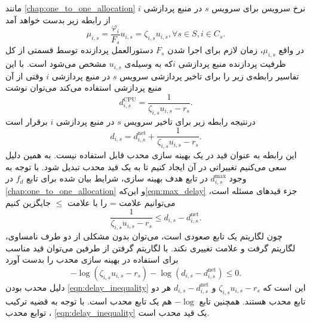     مانند \cref{chap:one_to_one_allocation} نرخ سرویس برای سرویس $s$ در منبع پردازشی $i$ از رابطه زیر بدست خواهد آمد
    \begin{equation}
      \mu_{i,s} = \frac{\varphi_i}{F_s} u_{i,s} = \zeta_{i,s} u_{i,s}, \forall s \in S, i \in C_s.
    \end{equation}
    در واقع $\mu_{i,s}$، زمان لازم برای اجرا شدن $F_s$ دستورالعمل پردازنده توسط قسمتی از کل ظرفیت پردازنده منبع پردازشی $i$که به وسیله‌ی $u_{i,s}$ مشخص می‌شود است.
    با این تفاسیر رابطه‌ی زیر را برای تاخیر پردازشی سرویس $s$ در منبع پردازشی $i$ وقتی از آن منبع پردازشی استفاده می‌کند می‌توان نوشت
    \begin{equation}
      d_{i,s}^\text{CPU} = \frac{1}{\zeta_{i,s} u_{i,s} - r_s}.
    \end{equation}
    درنتیجه رابطه زیر برای تاخیر سرویس $s$ در منبع پردازشی $i$ برقرار است
    \begin{equation}
      d_{i,s} = d_{i,s}^\text{net} + \frac{1}{\zeta_{i,s} u_{i,s} - r_s}.
    \end{equation}
    این رابطه به عنوان قید در یک بهینه سازی محدب قابل استفاده نیست.
    به همین دلیل سعی می‌کنیم تغییراتی در آن ایجاد کنیم تا به یک قید محدب تبدیل شود.
    با توجه به وجود $d_{i,s}^\text{max}$ در تابع هدف بهینه سازی، شرایط بیان شده برای تابع $f_d$ در \cref{chap:one_to_one_allocation} و این‌که\cref{eqn:max_delay} جزء قید‌های مسئله است، می‌توانیم علامت = را با علامت $\le$ جایگزین کنیم
    \begin{equation}
      \frac{1}{\zeta_{i,s} u_{i,s} - r_s} \le d_{i,s} - d_{i,s}^\text{net}.
    \end{equation}
    چون لگاریتم یک تابع صعودی است، می‌توان بدون مشکلی از دو طرف نامساوی، لگاریتم گرفت و علامت تغییری نکند.
    با لگاریتم گرفتن از طرفین می‌توان قید مناسب برای استفاده در بهینه سازی محدب را بدست آورد
    \begin{equation}\label{eqn:delay_inequality}
      - \log (\zeta_{i,s} u_{i,s} - r_s) - \log (d_{i,s} - d_{i,s}^\text{net}) \le 0.
    \end{equation}
    دلیل محدب بودن \cref{eqn:delay_inequality} این است که $\zeta_{i,s} u_{i,s} - r_s$ و $d_{i,s} - d_{i,s}^\text{net}$ هر دو تابع محدب هستند.
    همچنین تابع $-\log$ هم یک تابع محدب است.
    با توجه به قضیه ترکیب توابع محدب \cite{boyd2004convex}، \cref{eqn:delay_inequality} یک قید محدب است.


